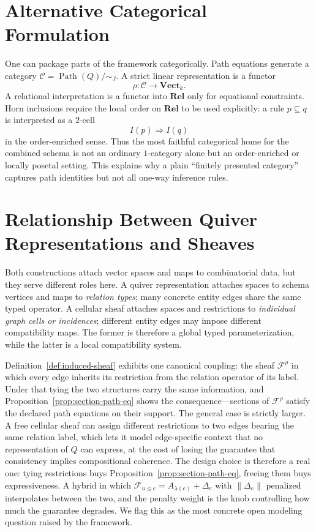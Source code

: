 \documentclass[11pt]{article}
\newcommand{\Rel}{\mathbf{Rel}}
\newcommand{\Vect}{\mathbf{Vect}}
\newcommand{\Path}{\operatorname{Path}}
\newcommand{\F}{\mathcal{F}}
\begin{document}
\section{Alternative Categorical Formulation}
One can package parts of the framework categorically. Path equations generate a category $\mathcal{C}=\Path(Q)/\sim_J$. A strict linear representation is a functor
\[
\rho:\mathcal{C}\to\Vect_k.
\]
A relational interpretation is a functor into $\Rel$ only for equational constraints. Horn inclusions require the local order on $\Rel$ to be used explicitly: a rule $p\subseteq q$ is interpreted as a $2$-cell
\[
I(p)\Rightarrow I(q)
\]
in the order-enriched sense. Thus the most faithful categorical home for the combined schema is not an ordinary $1$-category alone but an order-enriched or locally posetal setting. This explains why a plain ``finitely presented category'' captures path identities but not all one-way inference rules.

\section{Relationship Between Quiver Representations and Sheaves}
Both constructions attach vector spaces and maps to combinatorial data, but they serve different roles here. A quiver representation attaches spaces to schema vertices and maps to \emph{relation types}; many concrete entity edges share the same typed operator. A cellular sheaf attaches spaces and restrictions to \emph{individual graph cells or incidences}; different entity edges may impose different compatibility maps. The former is therefore a global typed parameterization, while the latter is a local compatibility system.

Definition~\ref{def:induced-sheaf} exhibits one canonical coupling: the sheaf $\F^{\rho}$ in which every edge inherits its restriction from the relation operator of its label. Under that tying the two structures carry the same information, and Proposition~\ref{prop:section-path-eq} shows the consequence---sections of $\F^{\rho}$ satisfy the declared path equations on their support. The general case is strictly larger. A free cellular sheaf can assign different restrictions to two edges bearing the same relation label, which lets it model edge-specific context that no representation of $Q$ can express, at the cost of losing the guarantee that consistency implies compositional coherence. The design choice is therefore a real one: tying restrictions buys Proposition~\ref{prop:section-path-eq}, freeing them buys expressiveness. A hybrid in which $\F_{u\unlhd e}=A_{\lambda(e)}+\Delta_e$ with $\|\Delta_e\|$ penalized interpolates between the two, and the penalty weight is the knob controlling how much the guarantee degrades. We flag this as the most concrete open modeling question raised by the framework.
\end{document}
